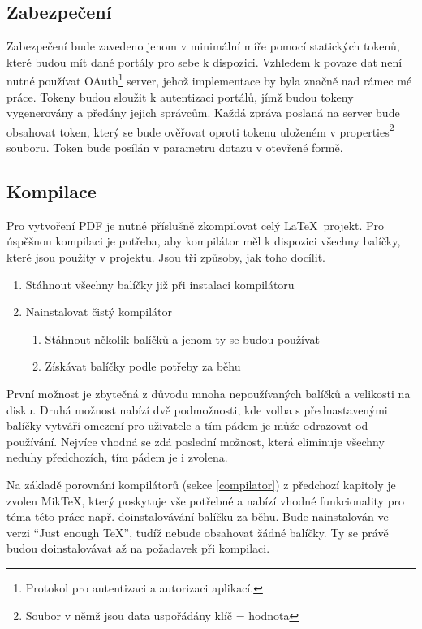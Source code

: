 \subsection{Zabezpečení}
Zabezpečení bude zavedeno jenom v minimální míře pomocí statických tokenů, které budou mít dané portály pro sebe k dispozici. Vzhledem k povaze dat není nutné používat OAuth\footnote{Protokol pro autentizaci a autorizaci aplikací.} server, jehož implementace by byla značně nad rámec mé práce. Tokeny budou sloužit k autentizaci portálů, jímž budou tokeny vygenerovány a předány jejich správcům. Každá zpráva poslaná na server bude obsahovat token, který se bude ověřovat oproti tokenu uloženém v properties\footnote{Soubor v němž jsou data uspořádány klíč = hodnota} souboru. Token bude posílán v parametru dotazu v otevřené formě. 

\subsection{Kompilace}
Pro vytvoření PDF je nutné příslušně zkompilovat celý \LaTeX\ projekt. Pro úspěšnou kompilaci je potřeba, aby kompilátor měl k dispozici všechny balíčky, které jsou použity v projektu. Jsou tři způsoby, jak toho docílit.
\begin{enumerate}
	\item Stáhnout všechny balíčky již při instalaci kompilátoru
	\item Nainstalovat čistý kompilátor
		\begin{enumerate}
			\item Stáhnout několik balíčků a jenom ty se budou používat
			\item Získávat balíčky podle potřeby za běhu
		\end{enumerate}
\end{enumerate}
První možnost je zbytečná z důvodu mnoha nepoužívaných balíčků a velikosti na disku. Druhá možnost nabízí dvě podmožnosti, kde volba s přednastavenými balíčky vytváří omezení pro uživatele a tím pádem je může odrazovat od používání. Nejvíce vhodná se zdá poslední možnost, která eliminuje všechny neduhy předchozích, tím pádem je i zvolena.
\par
Na základě porovnání kompilátorů (sekce \ref{compilator}) z předchozí kapitoly je zvolen MikTeX, který poskytuje vše potřebné a nabízí vhodné funkcionality pro téma této práce např. doinstalovávání balíčku za běhu. Bude nainstalován ve verzi \enquote{Just enough TeX}, tudíž nebude obsahovat žádné balíčky. Ty se právě budou doinstalovávat až na požadavek při kompilaci.

